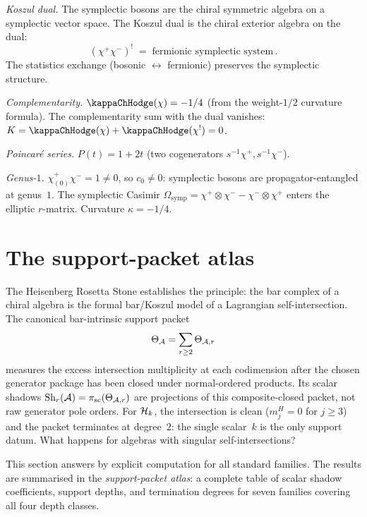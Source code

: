 \begin{computation}
\smallskip
\noindent
\emph{Koszul dual.}
The symplectic bosons are the chiral symmetric algebra on a
symplectic vector space. The Koszul dual is the chiral
exterior algebra on the dual:
\begin{equation}\label{eq:symplectic-boson-koszul}
(\chi^+\chi^-)^! \;=\; \text{fermionic symplectic system}\,.
\end{equation}
The statistics exchange (bosonic $\leftrightarrow$ fermionic)
preserves the symplectic structure.

\smallskip
\noindent
\emph{Complementarity.}
$\kappaChHodge(\chi) = -1/4$ (from the weight-$1/2$ curvature formula).
The complementarity sum with the dual vanishes:
$K = \kappaChHodge(\chi) + \kappaChHodge(\chi^!) = 0$.

\smallskip
\noindent
\emph{Poincar\'{e} series.}
$P(t) = 1 + 2t$ (two cogenerators $s^{-1}\chi^+, s^{-1}\chi^-$).

\smallskip
\noindent
\emph{Genus-$1$.}
$\chi^+_{(0)}\chi^- = 1 \ne 0$, so $c_0 \ne 0$: symplectic bosons
are propagator-entangled at genus~$1$. The symplectic Casimir
$\Omega_{\mathrm{symp}} = \chi^+ \otimes \chi^- - \chi^- \otimes \chi^+$
enters the elliptic $r$-matrix. Curvature $\kappa = -1/4$.
\end{computation}

\section{The support-packet atlas}%
\label{sec:shadow-tower-atlas}%
%

The Heisenberg Rosetta Stone establishes the principle:
the bar complex of a chiral algebra is the formal bar/Koszul model of
a Lagrangian self-intersection. The canonical bar-intrinsic support
packet
\[
\Theta_{\mathcal{A}}=\sum_{r\ge2}\Theta_{\mathcal{A},r}
\]
measures the excess intersection multiplicity at each codimension
after the chosen generator package has been closed under
normal-ordered products. Its scalar shadows
\(\operatorname{Sh}_r(\mathcal{A})=\pi_{\mathrm{sc}}(\Theta_{\mathcal{A},r})\)
are projections of this composite-closed packet, not raw generator
pole orders. For $\mathcal{H}_k$, the intersection is clean
($m^H_j=0$ for $j\ge3$) and the packet terminates at degree~$2$:
the single scalar~$k$ is the only support datum. What happens for
algebras with singular self-intersections?

This section answers by explicit computation for all
standard families. The results are summarised in the
\emph{support-packet atlas}: a complete table of scalar shadow
coefficients, support depths, and termination degrees for seven
families covering all four depth classes.

